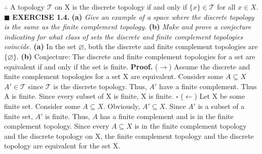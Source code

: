 \documentclass[12pt]{article}
\begin{document}
	\(\therefore\) A topology \(\mathcal{T}\) on X is the discrete topology if and only if \(\{x\}\in\mathcal{T}\) for all \(x \in X\). \newline \(\blacksquare\) \newline
	\newpage
	\noindent
	\textbf{EXERCISE 1.4.} \newline
	\textbf{(a)} \textit{Give an example of a space where the discrete topology is the same as the finite complement topology.} \newline
	\textbf{(b)} \textit{Make and prove a conjecture indicating for what class of sets the discrete and finite complement topologies coincide.}
	\newline \newline
	\textbf{(a)} In the set \(\varnothing\), both the discrete and finite complement topologies are \(\{\varnothing\}\).
	\newline \newline
	\textbf{(b)} Conjecture: The discrete and finite complement topologies for a set are equivalent if and only if the set is finite.
	\newline \newline
	\textbf{Proof. } \newline
	(\(\rightarrow\)) Assume the discrete and finite complement topologies for a set X are equivalent. \newline \newline
	Consider some \(A \subseteq X\) \newline
	\(A' \in \mathcal{T}\) since \(\mathcal{T}\) is the discrete topology. \newline
	Thus, \(A'\) have a finite complement. \newline
	Thus A is finite. \newline
	Since every subset of X is finite, X is finite.
	\newline \(\square\) \newline \newline
	(\(\leftarrow\)) Let X be some finite set. \newline \newline
	Consider some \(A \subseteq X\). \newline
	Obviously, \(A' \subseteq X\). \newline
	Since \(A'\) is a subset of a finite set, \(A'\) is finite. \newline
	Thus, \(A\) has a finite complement and is in the finite complement topology. \newline
	Since every \(A \subseteq X\) is in the finite complement topology and the discrete topology on X, the finite complement topology and the discrete topology are equivalent for the set X.
\end{document}
